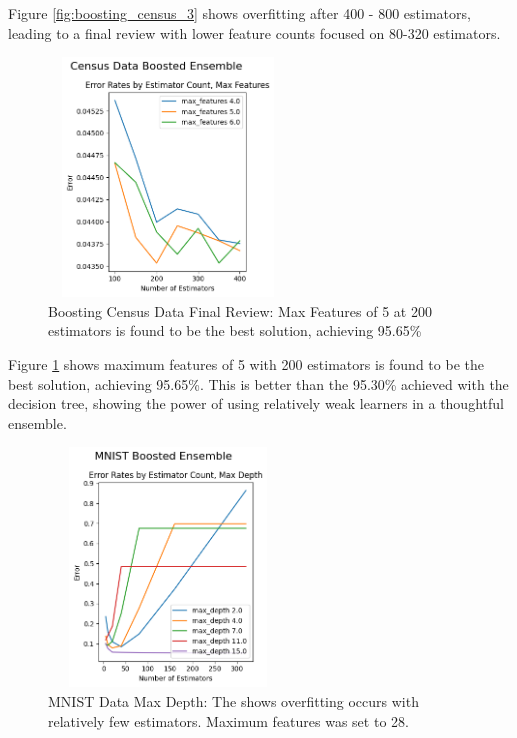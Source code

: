 \documentclass[letterpaper]{article} %
\begin{document}
Figure \ref{fig:boosting_census_3}  shows overfitting after 400 - 800 estimators, leading to a final review with lower feature counts focused on 80-320 estimators.


\begin{figure}[htb]
\centering
\includegraphics[width=2.5in, height=2.5in]{figures/Census_Data_Boosting_Estimator_Count_by_Max_Depth_boosting_4.png}
\caption{Boosting Census Data Final Review:  Max Features of 5 at 200 estimators is found to be the best solution, achieving  95.65\% }
\label{fig:boosting_census_4}
\end{figure}

Figure \ref{fig:boosting_census_4}  shows maximum features of 5 with 200 estimators is found to be the best solution, achieving  95.65\%.  This is better than the 95.30\% achieved with the decision tree, showing the power of using relatively weak learners in a thoughtful ensemble.

\begin{figure}[htb]
\centering
\includegraphics[width=2.5in, height=2.5in]{figures/MNIST_Boosted_Ensemble_boosting_1.png}
\caption{MNIST Data Max Depth:  The shows overfitting occurs with relatively few estimators.  Maximum features was set to 28.  }
\label{fig:boosting_mnist_1}
\end{figure}
\end{document}

